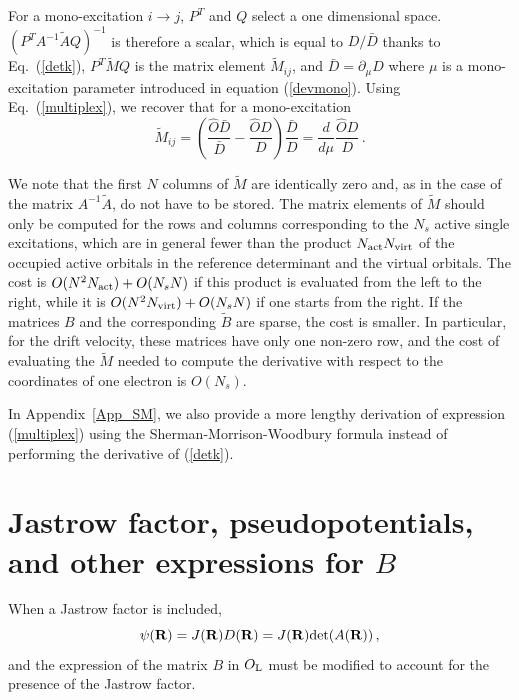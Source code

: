 \documentclass[aip,jcp,reprint,floatfix,onecolumn]{revtex4-1}
\def\det{\text{det}}
\def\A{A}
\def\wdet{D}
\begin{document}
For a mono-excitation $i \to j$, $P^T$ and $Q$ select a one dimensional space.  $(P^T \A^{-1} \tilde{\A} Q)^{-1}$ is therefore a scalar, which is equal to ${\wdet}/{\bar{\wdet}}$
thanks to Eq.~(\ref{detk}),  $P^T \tilde{M} Q$ is the matrix element $\tilde{M}_{ij}$, and $\bar{D}=\partial_\mu D$ where $\mu$ is a mono-excitation parameter introduced in equation  (\ref {devmono}).
Using Eq.~(\ref{multiplex}), we recover that for a mono-excitation
\begin{equation}
\tilde{M}_{ij} = \left(\frac{{\hat{O}}\bar{\wdet}}{\bar{\wdet}}-\frac{{\hat{O}}\wdet}{\wdet}\right)\frac{\bar{\wdet}}{\wdet} = \frac{d}{d\mu} \frac{{\hat{O}}\wdet}{\wdet}\,.
\end{equation}

We note that the first $N$ columns of $\tilde{M}$ are identically zero and, as in the case of the matrix $A^{-1}\tilde{A}$, do not have to be stored.
The matrix elements of $\tilde{M}$
should only be computed for the rows and columns corresponding to the $N_s$ active single excitations, which are in general fewer than the product
$N_{\rm act}N_{\rm virt}$ of the occupied active orbitals in the reference determinant and the virtual orbitals.
The cost is $O(N^2 N_{\rm act})+ O(N_s N)$ if this product is evaluated from the left to the right, while it is $O(N^2 N_{\rm virt})+ O(N_s N)$ if one starts from the right.
 If the matrices $B$ and the corresponding $\tilde{B}$ are sparse, the cost is smaller. In particular, for the drift velocity, these matrices have only one non-zero row, and the cost of evaluating the $\tilde{M}$ needed to compute the derivative with respect to the coordinates of one electron is $O(N_s)$.

In Appendix~\ref{App_SM}, we also provide a more lengthy derivation of expression (\ref{multiplex}) using the Sherman-Morrison-Woodbury
formula instead of performing the derivative of (\ref{detk}).


\section{Jastrow factor, pseudopotentials, and other expressions for $B$}
\label{jaspseB}

When a Jastrow factor is included,
\begin{equation}
\psi({\bf R}) = J ({\bf R}) D ({\bf R}) = J ({\bf R}) \det (A({\bf R}))\,,
\end{equation}
and the expression of the matrix $B$ in $O_{\rm L}$ must be modified to account for the presence of the Jastrow factor.
\end{document}
